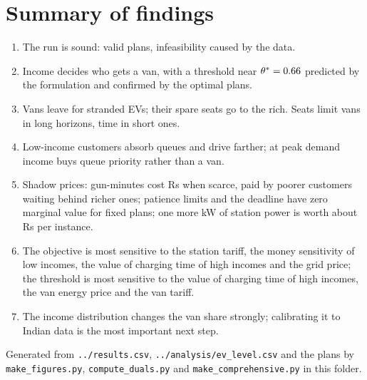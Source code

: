 \documentclass[11pt,a4paper]{article}
\begin{document}
\section{Summary of findings}
\begin{enumerate}
  \item The run is sound: \NValid{} valid plans, infeasibility caused by the data.
  \item Income decides who gets a van, with a threshold near $\theta^{*}=0.66$ predicted by the formulation and confirmed by the optimal plans.
  \item Vans leave for stranded EVs; their spare seats go to the rich. Seats limit vans in long horizons, time in short ones.
  \item Low-income customers absorb queues and drive farther; at peak demand income buys queue priority rather than a van.
  \item Shadow prices: gun-minutes cost \GunMean{} Rs when scarce, paid by poorer customers waiting behind richer ones; patience limits and the deadline have zero marginal value for fixed plans; one more kW of station power is worth about \DPFmean{} Rs per instance.
  \item The objective is most sensitive to the station tariff, the money sensitivity of low incomes, the value of charging time of high incomes and the grid price; the threshold is most sensitive to the value of charging time of high incomes, the van energy price and the van tariff.
  \item The income distribution changes the van share strongly; calibrating it to Indian data is the most important next step.
\end{enumerate}

\vspace{6pt}
{\footnotesize Generated from \texttt{../results.csv}, \texttt{../analysis/ev\_level.csv} and the plans by \texttt{make\_figures.py}, \texttt{compute\_duals.py} and \texttt{make\_comprehensive.py} in this folder.}
\end{document}
